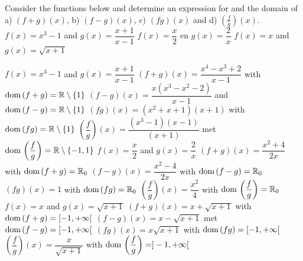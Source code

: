 \subsection*{}

\begin{Exercise} Consider the functions below and determine an expression for and the domain of a) $(f+g)(x)$, b) $(f-g)(x)$, c) $(fg)(x)$ and d)  $\left( \frac{f}{g} \right)(x)$. 
    	\Question[difficulty = 1] $f(x) = x^3-1 $ \quad and \quad $g(x)=\dfrac{x+1}{x-1}$
    	\Question[difficulty = 1]$f(x) = \dfrac{x}{2}$ \quad en \quad $g(x) = \dfrac{2}{x}$ 
    	\Question[difficulty = 1] $f(x) = x$ \quad and \quad $g(x) = \sqrt{x+1}$
\end{Exercise}

\begin{Answer}\phantom{}
    
    	\Question $f(x) = x^3-1 $ \quad and \quad $g(x)=\dfrac{x+1}{x-1}$
        	\subQuestion $(f+g)(x) = \dfrac{x^4-x^3+2}{x-1}$\; with $\text{dom}{\,} (f+g) = \mathbb{R}\setminus \{1\} $
        	\subQuestion $(f-g)(x) = \dfrac{x(x^3-x^2-2)}{x-1}$\; and $\text{dom}{\,}  (f-g) = \mathbb{R}\setminus \{1\} $
        	\subQuestion $(fg)(x) = (x^2+x+1)(x+1)$\; with $\text{dom}{\,}  (fg) = \mathbb{R}\setminus \{1\} $
        	\subQuestion $\left( \dfrac{f}{g} \right)(x) = \dfrac{(x^3-1)(x-1)}{(x+1)} $\; met $\text{dom}{\,} \left(\dfrac{f}{g} \right)  = \mathbb{R}\setminus \{-1,1\} $
    	\Question $f(x) = \dfrac{x}{2}$ \quad and \quad $g(x) = \dfrac{2}{x}$
    	    \subQuestion $(f+g)(x) = \dfrac{x^2+4}{2x}$\; with $\text{dom}{\,} (f+g) = \mathbb{R}_0$
        	\subQuestion $(f-g)(x) = \dfrac{x^2-4}{2x}$\; with $\text{dom}{\,}  (f-g) = \mathbb{R}_0$
        	\subQuestion $(fg)(x) = 1$\; with $\text{dom}{\,}  (fg) = \mathbb{R}_0 $
        	\subQuestion $\left( \dfrac{f}{g} \right)(x) = \dfrac{x^2}{4} $\; with $\text{dom}{\,} \left(\dfrac{f}{g} \right)  = \mathbb{R}_0$
    	\Question $f(x) = x$ \quad and \quad $g(x) = \sqrt{x+1}$ 
    	    \subQuestion $(f+g)(x) = x+ \sqrt{x+1}$\; with $\text{dom}{\,} (f+g) = [-1, + \infty[$
        	\subQuestion $(f-g)(x) = x - \sqrt{x+1}$\; met $\text{dom}{\,}  (f-g) = [-1, + \infty[$
        	\subQuestion $(fg)(x) = x\sqrt{x+1}$\; with $\text{dom}{\,}  (fg) = [-1, + \infty[$
        	\subQuestion $\left( \dfrac{f}{g} \right)(x) = \dfrac{x}{\sqrt{x+1}} $\; with $\text{dom}{\,} \left(\dfrac{f}{g} \right)  = ]-1, + \infty[$
    	
\end{Answer}

